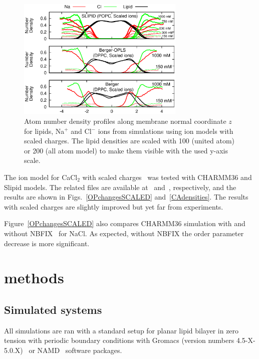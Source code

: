 \documentclass[pre,aps,floatfix,authordate1-4,twocolumn]{revtex4-1}
\begin{document}
\begin{figure}[]
  \centering
  \includegraphics[width=8cm]{../Fig/NAdensitiesSCALED.eps} 
  \caption{\label{NAdensitySCALED}
    Atom number density profiles along membrane normal coordinate $z$ for lipids, Na$^+$ and Cl$^-$ ions from simulations using
    ion models with scaled charges. The lipid densities are scaled with 100 (united atom) or 200 (all atom model) to make them visible with the used y-axis scale.
}
\end{figure}


The ion model for CaCl$_2$ with scaled charges~\cite{kohagen14} was tested with CHARMM36 and Slipid models.
The related files are available at~\cite{charmmFILESpopc450mMcaclSCALED} and~\cite{slipidsFILESpopc450mMcaclSCALED},
respectively, and the results are shown in Figs.~\ref{OPchangesSCALED} and~\ref{CAdensities}.
The results with scaled charges are slightly improved but yet far from experiments.

Figure~\ref{OPchangesSCALED} also compares CHARMM36 simulation with and without NBFIX~\cite{venable13} for NaCl.
As expected, without NBFIX the order parameter decrease is more significant.




\section{methods}

\subsection{Simulated systems}
All simulations are ran with a standard setup for planar lipid bilayer in zero tension
with periodic boundary conditions with Gromacs (version numbers 4.5-X-5.0.X)~\cite{pronk13,abraham15} 
or NAMD~\cite{NAMD} software packages.
\end{document}
